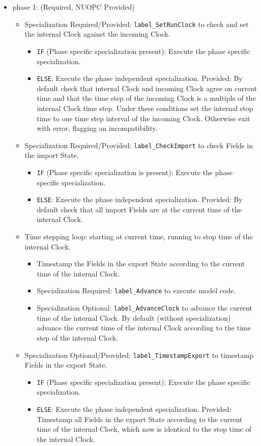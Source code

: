 \begin{itemize}
\item phase 1: ({\sc Required, NUOPC Provided})
  \begin{itemize}
  \item {\sc Specialization Required/Provided}: {\tt label\_SetRunClock} to check and set the internal Clock against the incoming Clock.
  \begin{itemize}
  \item {\tt IF} (Phase specific specialization present): Execute the phase specific specialization.
  \item {\tt ELSE}: Execute the phase independent specialization. {\sc Provided}: By default check that internal Clock and incoming Clock agree on current time and that the time step of the incoming Clock is a multiple of the internal Clock time step. Under these conditions set the internal stop time to one time step interval of the incoming Clock. Otherwise exit with error, flagging an incompatibility.
  \end{itemize}
  \item {\sc Specialization Required/Provided}: {\tt label\_CheckImport} to check Fields in the import State.
  \begin{itemize}
  \item {\tt IF} (Phase specific specialization is present): Execute the phase specific specialization.
  \item {\tt ELSE}: Execute the phase independent specialization. {\sc Provided}: By default check that all import Fields are at the current time of the internal Clock.
  \end{itemize}
  \item Time stepping loop: starting at current time, running to stop time of the internal Clock.
  \begin{itemize}
  \item Timestamp the Fields in the export State according to the current time of the internal Clock.
  \item {\sc Specialization Required}: {\tt label\_Advance} to execute model code.
  \item {\sc Specialization Optional}: {\tt label\_AdvanceClock} to advance the current time of the internal Clock. By default (without specialization) advance the current time of the internal Clock according to the time step of the internal Clock.
  \end{itemize}
  \item {\sc Specialization Optional/Provided}: {\tt label\_TimestampExport} to timestamp Fields in the export State.
  \begin{itemize}
  \item {\tt IF} (Phase specific specialization present): Execute the phase specific specialization.
  \item {\tt ELSE}: Execute the phase independent specialization. {\sc Provided}: Timestamp all Fields in the export State according to the current time of the internal Clock, which now is identical to the stop time of the internal Clock.
  \end{itemize}
  \end{itemize}    
\end{itemize}

